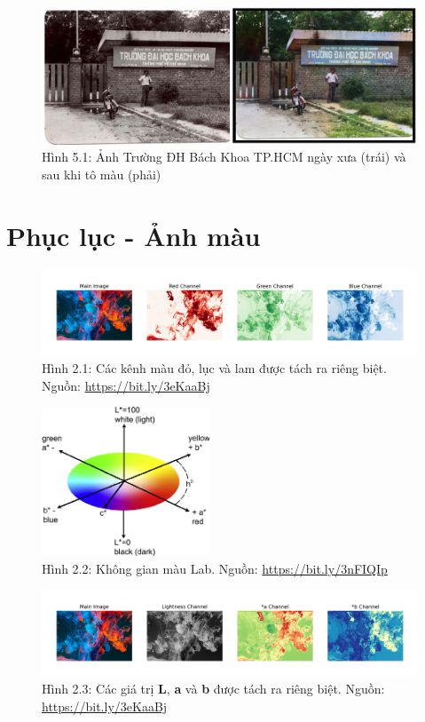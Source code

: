 \documentclass[a4paper]{article}
\begin{document}
\begin{figure}[h!]
\centering
\includegraphics[width=14cm]{images/5_1.PNG}
\caption{Hình 5.1: Ảnh Trường ĐH Bách Khoa TP.HCM ngày xưa (trái) và sau khi tô màu (phải)}
\end{figure}

\clearpage

\section{Phục lục - Ảnh màu}

\begin{figure}[h!]
\centering
\includegraphics[width=14cm]{images/2_1.jpeg}
\caption*{Hình 2.1: Các kênh màu đỏ, lục và lam được tách ra riêng biệt. Nguồn: \href{https://bit.ly/3eKaaBj}{https://bit.ly/3eKaaBj}}
\end{figure}

\begin{figure}[h!]
\centering
\includegraphics[width=5cm]{images/2_2.png}
\caption*{Hình 2.2: Không gian màu Lab. Nguồn: \href{https://bit.ly/3nFIQIp}{https://bit.ly/3nFIQIp}}
\end{figure}

\begin{figure}[h!]
\centering
\includegraphics[width=14cm]{images/2_3.jpeg}
\caption*{Hình 2.3: Các giá trị \textbf{L}, \textbf{a} và \textbf{b} được tách ra riêng biệt. Nguồn: \href{https://bit.ly/3eKaaBj}{https://bit.ly/3eKaaBj}}
\end{figure}
\end{document}
